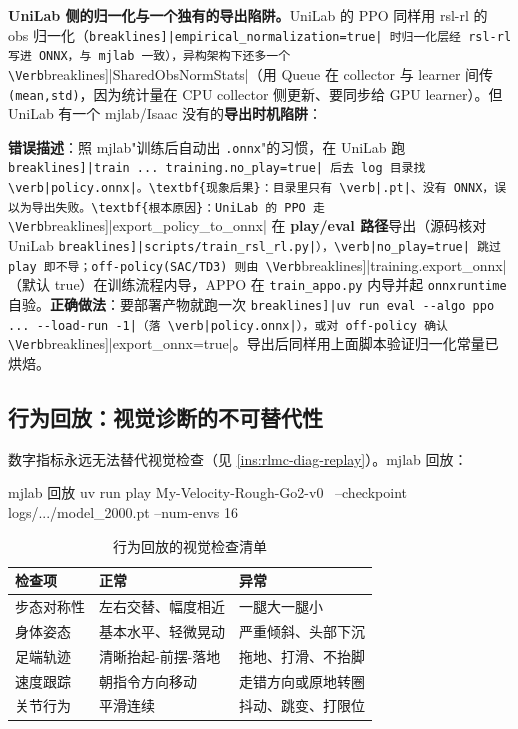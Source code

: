 \textbf{UniLab 侧的归一化与一个独有的导出陷阱。}UniLab 的 PPO 同样用 rsl-rl 的 obs 归一化（\Verb[breaklines]|empirical_normalization=true| 时归一化层经 rsl-rl 写进 ONNX，与 mjlab 一致），异构架构下还多一个 \Verb[breaklines]|SharedObsNormStats|（用 Queue 在 collector 与 learner 间传 \verb|(mean,std)|，因为统计量在 CPU collector 侧更新、要同步给 GPU learner）。但 UniLab 有一个 mjlab/Isaac 没有的\textbf{导出时机陷阱}：

\begin{pitfall}[UniLab PPO 在 play/eval 阶段才导 ONNX，训练时加 \texttt{no\_play=true} 会拿不到部署产物]
\textbf{错误描述}：照 mjlab"训练后自动出 \verb|.onnx|"的习惯，在 UniLab 跑 \Verb[breaklines]|train ... training.no_play=true| 后去 log 目录找 \verb|policy.onnx|。\textbf{现象后果}：目录里只有 \verb|.pt|、没有 ONNX，误以为导出失败。\textbf{根本原因}：UniLab 的 PPO 走 \Verb[breaklines]|export_policy_to_onnx| 在 \textbf{play/eval 路径}导出（源码核对 UniLab \Verb[breaklines]|scripts/train_rsl_rl.py|），\verb|no_play=true| 跳过 play 即不导；off-policy(SAC/TD3) 则由 \Verb[breaklines]|training.export_onnx|（默认 true）在训练流程内导，APPO 在 \verb|train_appo.py| 内导并起 \verb|onnxruntime| 自验。\textbf{正确做法}：要部署产物就跑一次 \Verb[breaklines]|uv run eval --algo ppo ... --load-run -1|（落 \verb|policy.onnx|），或对 off-policy 确认 \Verb[breaklines]|export_onnx=true|。导出后同样用上面脚本验证归一化常量已烘焙。
\end{pitfall}

\subsection{行为回放：视觉诊断的不可替代性}

数字指标永远无法替代视觉检查（见 \cref{ins:rlmc-diag-replay}）。mjlab 回放：

\begin{codebox}[bash]{mjlab 回放}
uv run play My-Velocity-Rough-Go2-v0 \
  --checkpoint logs/.../model_2000.pt --num-envs 16
\end{codebox}

\begin{table}[H]
\centering
\caption{行为回放的视觉检查清单}
\label{tab:rlmc-diag-visual}
\begin{tabular}{p{2.6cm}p{4.6cm}p{4.6cm}}
\hline
检查项 & 正常 & 异常 \\
\hline
步态对称性 & 左右交替、幅度相近 & 一腿大一腿小 \\
身体姿态 & 基本水平、轻微晃动 & 严重倾斜、头部下沉 \\
足端轨迹 & 清晰抬起-前摆-落地 & 拖地、打滑、不抬脚 \\
速度跟踪 & 朝指令方向移动 & 走错方向或原地转圈 \\
关节行为 & 平滑连续 & 抖动、跳变、打限位 \\
\hline
\end{tabular}
\end{table}

